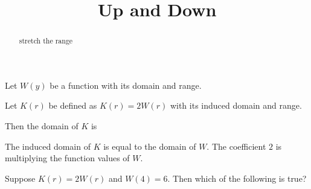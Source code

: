 \documentclass{ximera}
\title{Up and Down}
\begin{document}
\begin{abstract}
stretch the range
\end{abstract}
\maketitle











Let $W(y)$ be a function with its domain and range.

Let $K(r)$ be defined as $K(r) = 2 W(r)$ with its induced domain and range.


Then the domain of $K$ is

\begin{multipleChoice}
\end{multipleChoice}

The induced domain of $K$ is equal to the domain of $W$.  The coefficient $2$ is multiplying the function values of $W$.



\begin{question}


Suppose $K(r) = 2 W(r)$ and $W(4) = 6$.  Then which of the following is true?

\begin{multipleChoice}
\end{multipleChoice}


\end{question}
\end{document}
